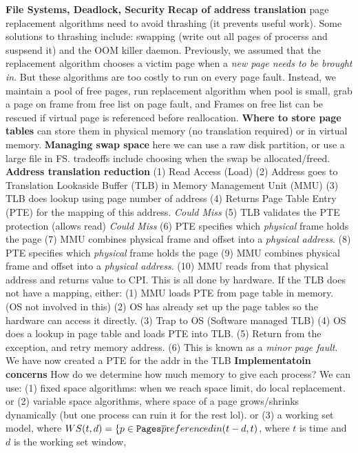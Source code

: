 {\bf File Systems, Deadlock, Security}
{\bf Recap of address
translation}
page replacement algorithms need to avoid thrashing (it prevents useful work). Some solutions
to thrashing include: swapping (write out all pages of procerss and suspsend it) and the OOM killer daemon.
Previously, we assumed that the replacement algorithm chooses a victim page
when a \emph{new page needs to be brought in}. But these algorithms are too
costly to run on every page fault. Instead, we maintain a pool of free pages,
run replacement algorithm when pool is small, grab a page on frame from free
list on page fault, and Frames on free list can be rescued if virtual page is
referenced before reallocation.
{\bf Where to store page
tables } can store them in physical memory (no translation required) or in virtual memory.
{\bf Managing swap space} here we can use a raw disk partition, or use a large
file in FS. tradeoffs include choosing when the swap be allocated/freed.  {\bf
Address translation reduction} (1)  Read Access (Load)
  (2) Address goes to Translation Lookaside Buffer (TLB) in Memory
  Management Unit (MMU)
  (3) TLB does lookup using page number of address
  (4) Returns Page Table Entry (PTE) for the mapping of this address.
    \emph{Could Miss}
  (5)  TLB validates the PTE protection (allows read) \emph{Could Miss}
    (6)  PTE specifies which \emph{physical} frame holds the page
    (7) MMU combines physical frame and offset into a \emph{physical
    address}.
    (8) PTE specifies which \emph{physical} frame holds the page
    (9) MMU combines physical frame and offset into a \emph{physical
    address}.
    (10) MMU reads from that physical address and returns value to CPI.
  This is all done by hardware.
  If the TLB does not have a mapping, either:
    (1)  MMU loads PTE from page table in memory. (OS not involved in this)
    (2) OS has already set up the page tables so the hardware can access it
    directly.
    (3) Trap to OS (Software managed TLB)
    (4) OS does a lookup in page table and loads PTE into TLB.
    (5) Return from the exception, and retry memory address.
    (6) This is known as a \emph{minor page fault}. We have now created a
    PTE for the addr in the TLB
{\bf Implementatoin concerns} How do we determine how much memory to give each
process? We can use: (1) fixed space algorithms: when we reach space limit, do
local replacement. or (2) variable space algorithms, where space of a page
grows/shrinks dynamically (but one process can ruin it for the rest lol). or
(3) a working set model, where $WS(t,d) = \{ p \in {\tt Pages} \bar p {\text
referenced in } (t-d, t)$, where $t$ is time and $d$ is the working set window,
